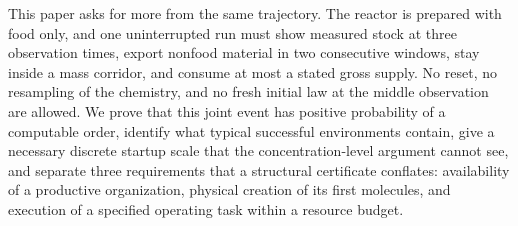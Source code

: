 \documentclass[11pt,letterpaper]{article}
\theoremstyle{plain}
\theoremstyle{definition}
\theoremstyle{remark}
\numberwithin{equation}{section}
\begin{document}
This paper asks for more from the same trajectory. The reactor is prepared with food only, and one uninterrupted run must show measured stock at three observation times, export nonfood material in two consecutive windows, stay inside a mass corridor, and consume at most a stated gross supply. No reset, no resampling of the chemistry, and no fresh initial law at the middle observation are allowed. We prove that this joint event has positive probability of a computable order, identify what typical successful environments contain, give a necessary discrete startup scale that the concentration-level argument cannot see, and separate three requirements that a structural certificate conflates: availability of a productive organization, physical creation of its first molecules, and execution of a specified operating task within a resource budget.
\end{document}
